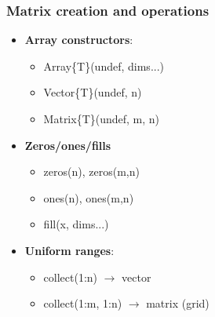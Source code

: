 \documentclass{report}
\begin{document}
    \subsubsection{Matrix creation and operations}
    \begin{itemize}
        \item \textbf{Array constructors}:
            \begin{itemize}
                \item Array\{T\}(undef, dims...)
                \item Vector\{T\}(undef, n)
                \item Matrix\{T\}(undef, m, n)
            \end{itemize}
        \item \textbf{Zeros/ones/fills}
            \begin{itemize}
                \item zeros(n), zeros(m,n)
                \item ones(n), ones(m,n)
                \item fill(x, dims...)
            \end{itemize}
        \item \textbf{Uniform ranges}:
            \begin{itemize}
                \item collect(1:n) $\to$ vector
                \item collect(1:m, 1:n) $\to$ matrix (grid)
            \end{itemize}
    \end{itemize}



















    
\end{document}
